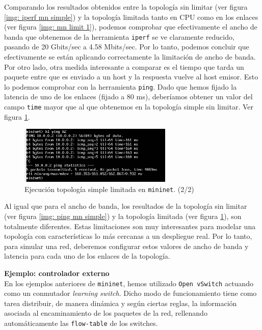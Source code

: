 \documentclass[a4paper, oneside, 12pt]{book}
\begin{document}
	\noindent Comparando los resultados obtenidos entre la topología sin limitar (ver figura \ref{img: iperf mn simple}) y la topología limitada tanto en CPU como en los enlaces (ver figura \ref{img: mn limit 1}), podemos comprobar que efectivamente el ancho de banda que obtenemos de la herramienta \texttt{iperf} se ve claramente reducido, pasando de 20 Gbits/sec a 4.58 Mbits/sec. Por lo tanto, podemos concluir que efectivamente se están aplicando correctamente la limitación de ancho de banda. \\
	
	\noindent Por otro lado, otra medida interesante a comparar es el tiempo que tarda un paquete entre que es enviado a un host y la respuesta vuelve al host emisor. Esto lo podemos comprobar con la herramienta \texttt{ping}. Dado que hemos fijado la latencia de uno de los enlaces (fijado a 80 ms), deberíamos obtener un valor del campo \texttt{time} mayor que al que obtenemos en la topología simple sin limitar. Ver figura \ref{img: mn limit 2}.
	
	\begin{figure}[h!]
		\begin{center}
			\includegraphics[width=0.65\textwidth]{img/mn_limit_2.png}
			\caption{Ejecución topología simple limitada en \texttt{mininet}. (2/2)}
			\label{img: mn limit 2}	
		\end{center}
	\end{figure}

	\noindent Al igual que para el ancho de banda, los resultados de la topología sin limitar (ver figura \ref{img: ping mn simple}) y la topología limitada (ver figura \ref{img: mn limit 2}), son totalmente diferentes. Estas limitaciones son muy interesantes para modelar una topología con características lo más cercanas a un despliegue real. Por lo tanto, para simular una red, deberemos configurar estos valores de ancho de banda y latencia para cada uno de los enlaces de la topología.
	
	\pagebreak
	
	\noindent \textbf{\large Ejemplo: controlador externo}\\
	
	\noindent En los ejemplos anteriores de \texttt{mininet}, hemos utilizado \texttt{Open vSwitch} actuando como un conmutador \textit{learning switch}. Dicho modo de funcionamiento tiene como tarea distribuir, de manera dinámica y según ciertas reglas, la información asociada al encaminamiento de los paquetes de la red, rellenando automáticamente las \texttt{flow-table} de los switches. \\
	
\end{document}

